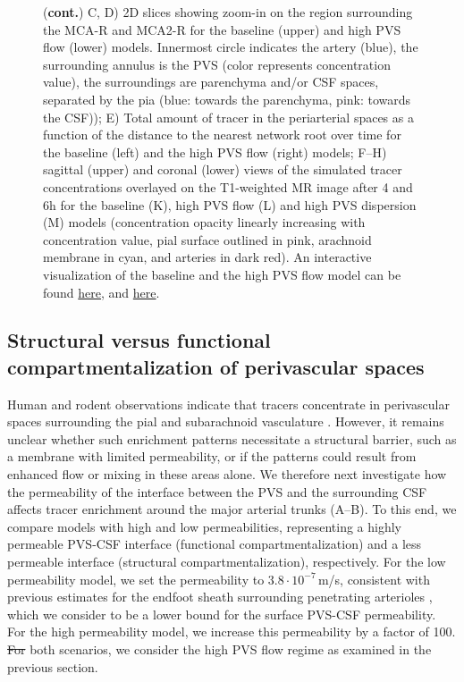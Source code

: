 \documentclass[fleqn,10pt]{wlscirep}
\providecommand{\DIFadd}[1]{{\protect\color{blue}\uwave{#1}}} %
\providecommand{\DIFdel}[1]{{\protect\color{red}\sout{#1}}}                      %
\providecommand{\DIFaddbegin}{} %
\providecommand{\DIFaddend}{} %
\providecommand{\DIFdelbegin}{} %
\providecommand{\DIFdelend}{} %
\begin{document}
\begin{figure}
\ContinuedFloat
\caption{(\textbf{cont.})
    C, D) 2D slices showing zoom-in on the region surrounding the MCA-R and MCA2-R for the baseline (upper) and high PVS flow (lower) models. Innermost circle indicates the artery (blue), the surrounding annulus is the PVS (color represents concentration value), the surroundings are parenchyma and/or CSF spaces, separated by the pia (blue: towards the parenchyma, pink: towards the CSF));  
    E) Total amount of tracer in the periarterial spaces as a function of the distance to the nearest network root over time for the baseline (left) and the high PVS flow (right) models;
    F--H) sagittal (upper) and coronal (lower) views of the simulated tracer concentrations overlayed on the T1-weighted MR image after 4 and 6h for the baseline (K), high PVS flow (L) and high PVS dispersion (M) models (concentration opacity linearly increasing with concentration value, pial surface outlined in pink, arachnoid membrane in cyan, and arteries in dark red). An interactive visualization of the baseline and the high PVS flow model can be found \href{https://baseline-pvs-flow.surge.sh/}{here}, and \href{https://high-pvs-flow.surge.sh/}{here}.}
\end{figure}  

\subsection*{Structural versus functional compartmentalization of perivascular spaces}

Human and rodent observations indicate that tracers concentrate in perivascular spaces surrounding the pial and subarachnoid vasculature \cite{zhang1990interrelationships,zhang1992directional, bedussi2017paravascular, mestre2018flow, bedussi2018paravascular, eide2024functional}. However, it remains unclear whether such enrichment patterns necessitate a structural barrier, such as a membrane with limited permeability, or if the patterns could result from enhanced flow or mixing in these areas alone. We therefore next investigate how the permeability of the interface between the PVS and the surrounding CSF affects tracer enrichment around the major arterial trunks (A--B). To this end, we compare models with high and low  permeabilities, representing a highly permeable PVS-CSF interface (functional compartmentalization) and a less permeable interface (structural compartmentalization), respectively. For the low permeability model, we set the permeability to $3.8 \cdot 10^{-7}\,$m/s, consistent with previous estimates for the endfoot sheath surrounding penetrating arterioles \cite{koch2023estimates}, which we consider to be a lower bound for the surface PVS-CSF permeability. For the high permeability model, we increase this permeability by a factor of 100. \DIFdelbegin \DIFdel{For }\DIFdelend \DIFaddbegin \DIFadd{We emphasize that, for }\DIFaddend both scenarios, we consider the high PVS flow regime as examined in the previous section. 
\end{document}
